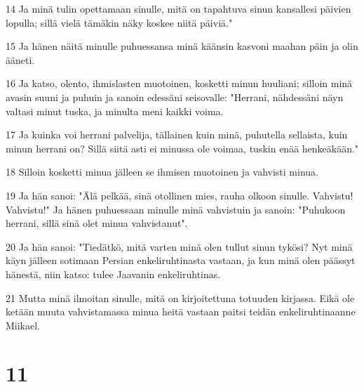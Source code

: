 \par 14 Ja minä tulin opettamaan sinulle, mitä on tapahtuva sinun kansallesi päivien lopulla; sillä vielä tämäkin näky koskee niitä päiviä."
\par 15 Ja hänen näitä minulle puhuessansa minä käänsin kasvoni maahan päin ja olin ääneti.
\par 16 Ja katso, olento, ihmislasten muotoinen, kosketti minun huuliani; silloin minä avasin suuni ja puhuin ja sanoin edessäni seisovalle: "Herrani, nähdessäni näyn valtasi minut tuska, ja minulta meni kaikki voima.
\par 17 Ja kuinka voi herrani palvelija, tällainen kuin minä, puhutella sellaista, kuin minun herrani on? Sillä siitä asti ei minussa ole voimaa, tuskin enää henkeäkään."
\par 18 Silloin kosketti minua jälleen se ihmisen muotoinen ja vahvisti minua.
\par 19 Ja hän sanoi: "Älä pelkää, sinä otollinen mies, rauha olkoon sinulle. Vahvistu! Vahvistu!" Ja hänen puhuessaan minulle minä vahvistuin ja sanoin: "Puhukoon herrani, sillä sinä olet minua vahvistanut".
\par 20 Ja hän sanoi: "Tiedätkö, mitä varten minä olen tullut sinun tykösi? Nyt minä käyn jälleen sotimaan Persian enkeliruhtinasta vastaan, ja kun minä olen päässyt hänestä, niin katso: tulee Jaavanin enkeliruhtinas.
\par 21 Mutta minä ilmoitan sinulle, mitä on kirjoitettuna totuuden kirjassa. Eikä ole ketään muuta vahvistamassa minua heitä vastaan paitsi teidän enkeliruhtinaanne Miikael.

\chapter{11}

